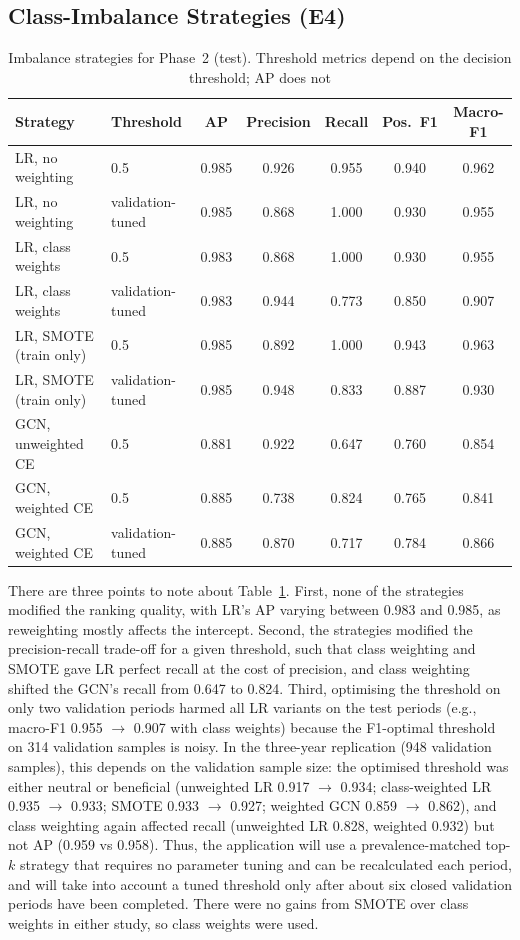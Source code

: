 \documentclass[11pt,a4paper]{report}
\begin{document}
\subsection{Class-Imbalance Strategies (E4)}
\begin{table}[H]
\centering\small
\caption{Imbalance strategies for Phase~2 (test). Threshold metrics depend on the decision threshold; AP does not}
\label{tab:imb}
\begin{tabular}{@{}llccccc@{}}
\toprule
Strategy & Threshold & AP & Precision & Recall & Pos.\ F1 & Macro-F1\\
\midrule
LR, no weighting & 0.5 & 0.985 & 0.926 & 0.955 & 0.940 & 0.962\\
LR, no weighting & validation-tuned & 0.985 & 0.868 & 1.000 & 0.930 & 0.955\\
LR, class weights & 0.5 & 0.983 & 0.868 & 1.000 & 0.930 & 0.955\\
LR, class weights & validation-tuned & 0.983 & 0.944 & 0.773 & 0.850 & 0.907\\
LR, SMOTE (train only) & 0.5 & 0.985 & 0.892 & 1.000 & 0.943 & 0.963\\
LR, SMOTE (train only) & validation-tuned & 0.985 & 0.948 & 0.833 & 0.887 & 0.930\\
GCN, unweighted CE & 0.5 & 0.881 & 0.922 & 0.647 & 0.760 & 0.854\\
GCN, weighted CE & 0.5 & 0.885 & 0.738 & 0.824 & 0.765 & 0.841\\
GCN, weighted CE & validation-tuned & 0.885 & 0.870 & 0.717 & 0.784 & 0.866\\
\bottomrule
\end{tabular}
\end{table}
There are three points to note about Table~\ref{tab:imb}. First, none of the strategies modified the ranking quality, with LR's AP varying between 0.983 and 0.985, as reweighting mostly affects the intercept. Second, the strategies modified the precision-recall trade-off for a given threshold, such that class weighting and SMOTE gave LR perfect recall at the cost of precision, and class weighting shifted the GCN's recall from 0.647 to 0.824. Third, optimising the threshold on only two validation periods harmed all LR variants on the test periods (e.g., macro-F1 0.955 $\to$ 0.907 with class weights) because the F1-optimal threshold on 314 validation samples is noisy. In the three-year replication (948 validation samples), this depends on the validation sample size: the optimised threshold was either neutral or beneficial (unweighted LR 0.917 $\to$ 0.934; class-weighted LR 0.935 $\to$ 0.933; SMOTE 0.933 $\to$ 0.927; weighted GCN 0.859 $\to$ 0.862), and class weighting again affected recall (unweighted LR 0.828, weighted 0.932) but not AP (0.959 vs 0.958). Thus, the application will use a prevalence-matched top-$k$ strategy that requires no parameter tuning and can be recalculated each period, and will take into account a tuned threshold only after about six closed validation periods have been completed. There were no gains from SMOTE over class weights in either study, so class weights were used.
\end{document}
